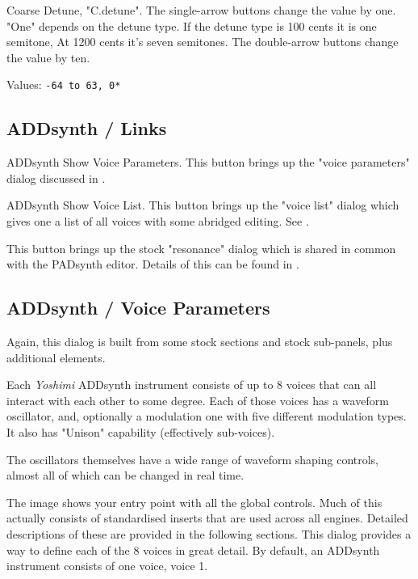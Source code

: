    Coarse Detune, "C.detune".
   The single-arrow buttons change the value by one.
   "One" depends on the detune type.
   If the detune type is 100 cents it is one semitone,
   At 1200 cents it's seven semitones.
   The double-arrow buttons change the value by ten.

   Values: \texttt{-64 to 63, 0*}

   \subsection{ADDsynth / Links}
   \label{subsec:addsynth_links}
   \setcounter{ItemCounter}{0}
   ADDsynth Show Voice Parameters.
   This button brings up the "voice parameters" dialog discussed in
   .

   ADDsynth Show Voice List.
   This button brings up the "voice list" dialog which gives one a list of all
   voices with some abridged editing. See .

   This button brings up the stock "resonance" dialog which is shared in common with the PADsynth editor. Details of this can be found in .

\subsection{ADDsynth / Voice Parameters}
\label{subsec:addsynth_voice_parameters}

   Again, this dialog is built from some stock sections and stock
   sub-panels, plus additional elements.

   Each \textsl{Yoshimi} ADDsynth instrument consists of up to 8 voices
   that can all interact with each other to some degree. Each of those voices
   has a waveform oscillator, and, optionally a modulation one with five
   different modulation types. It also has "Unison" capability (effectively
   sub-voices).

   The oscillators themselves have a wide range of waveform shaping controls,
   almost all of which can be changed in real time.

    The image shows your entry point with all the global controls. Much of this
    actually consists of standardised inserts that are used across all engines.
    Detailed descriptions of these are provided in the following sections.
    This dialog provides a way to define each of the 8 voices in great detail.
    By default, an ADDsynth instrument consists of one voice, voice 1.

